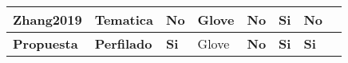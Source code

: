 \begin{table}[!hbt]
{\begin{tabular}{llllllll}
Zhang2019          & Tematica             & No                                                              & Glove                                                      & No                                                                    & Si          & No                                                                                  \\ \hline
\textbf{Propuesta} & \textbf{Perfilado} & \textbf{Si}                                                     & Glove                                                      & \textbf{No}                                                                    & \textbf{Si} & \textbf{Si}                                                                         \\ \hline
\end{tabular}
%
}
\end{table}
